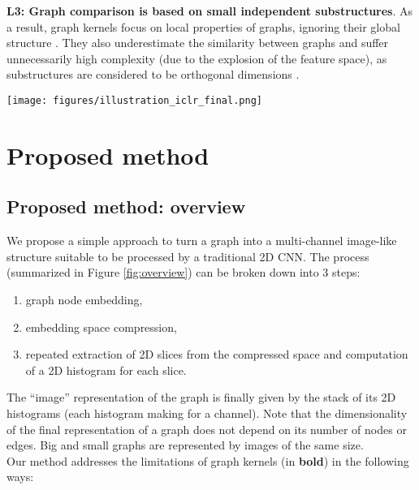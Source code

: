 \documentclass[sigconf]{acmart}
\begin{document}
\textbf{L3: Graph comparison is based on small independent substructures}. As a result, graph kernels focus on local properties of graphs, ignoring their global structure \citep{nikolentzos2017matching}. They also underestimate the similarity between graphs and suffer unnecessarily high complexity (due to the explosion of the feature space), as substructures are considered to be orthogonal dimensions \citep{yanardag2015deep}.

\begin{figure*}[ht!]
  \centering
    \texttt{[image: figures/illustration\_iclr\_final.png]}
\captionsetup{justification=justified,size=small}
    \caption{Our 3-step approach represents graphs as ``images'' suitable to be passed to vanilla 2D CNNs (continuous node attribute vectors can be passed as extra channels). Steps 1 \& 2: graph node embeddings and compression with PCA. Step 3: computation and stacking of the 2D histograms.}
\label{fig:overview}
\end{figure*}

\section{Proposed method}
\subsection{Proposed method: overview}
We propose a simple approach to turn a graph into a multi-channel image-like structure suitable to be processed by a traditional 2D CNN. The process (summarized in Figure \ref{fig:overview}) can be broken down into 3 steps:
\begin{enumerate}
\item graph node embedding,
\item embedding space compression,
\item repeated extraction of 2D slices from the compressed space and computation of a 2D histogram for each slice.
\end{enumerate}
The ``image'' representation of the graph is finally given by the stack of its 2D histograms (each histogram making for a channel). Note that the dimensionality of the final representation of a graph does not depend on its number of nodes or edges. Big and small graphs are represented by images of the same size.\\

Our method addresses the limitations of graph kernels (in \textbf{bold}) in the following ways: 
\end{document}
